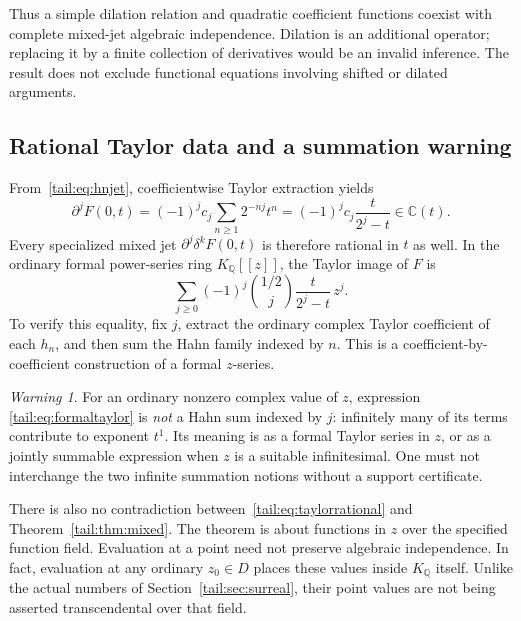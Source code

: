 \documentclass[11pt,a4paper]{article}
\numberwithin{equation}{section}
\theoremstyle{definition}
\theoremstyle{remark}
\newtheorem{warning}[theorem]{Warning}
\newcommand{\C}{\mathbb C}
\newcommand{\Q}{\mathbb Q}
\newcommand{\EDer}{\delta}
\begin{document}
Thus a simple dilation relation and quadratic coefficient functions
coexist with complete mixed-jet algebraic independence. Dilation is an
additional operator; replacing it by a finite collection of derivatives
would be an invalid inference. The result does not exclude functional
equations involving shifted or dilated arguments.

\subsection{Rational Taylor data and a summation warning}
From~\eqref{tail:eq:hnjet}, coefficientwise Taylor extraction yields
\begin{equation}\label{tail:eq:taylorrational}
 \partial^jF(0,t)=(-1)^jc_j\sum_{n\geq1}2^{-nj}t^n
          =(-1)^jc_j\frac{t}{2^j-t}\in\C(t).
\end{equation}
Every specialized mixed jet $\partial^j\EDer^kF(0,t)$ is therefore
rational in $t$ as well. In the ordinary formal power-series ring
$K_\Q[[z]]$, the Taylor image of $F$ is
\begin{equation}\label{tail:eq:formaltaylor}
 \sum_{j\geq0}(-1)^j\binom{1/2}{j}
                       \frac{t}{2^j-t}\,z^j.
\end{equation}
To verify this equality, fix $j$, extract the ordinary complex Taylor
coefficient of each $h_n$, and then sum the Hahn family indexed by $n$.
This is a coefficient-by-coefficient construction of a formal $z$-series.

\begin{warning}\label{tail:warn:taylor}
For an ordinary nonzero complex value of $z$, expression
\eqref{tail:eq:formaltaylor} is \emph{not} a Hahn sum indexed by $j$:
infinitely many of its terms contribute to exponent $t^1$. Its meaning
is as a formal Taylor series in $z$, or as a jointly summable expression
when $z$ is a suitable infinitesimal. One must not interchange the two
infinite summation notions without a support certificate.
\end{warning}

There is also no contradiction between~\eqref{tail:eq:taylorrational} and
Theorem~\ref{tail:thm:mixed}. The theorem is about functions in $z$ over the
specified function field. Evaluation at a point need not preserve
algebraic independence. In fact, evaluation at any ordinary $z_0\in D$
places these values inside $K_\Q$ itself. Unlike the actual numbers of
Section~\ref{tail:sec:surreal}, their point values are not being asserted
transcendental over that field.
\end{document}
